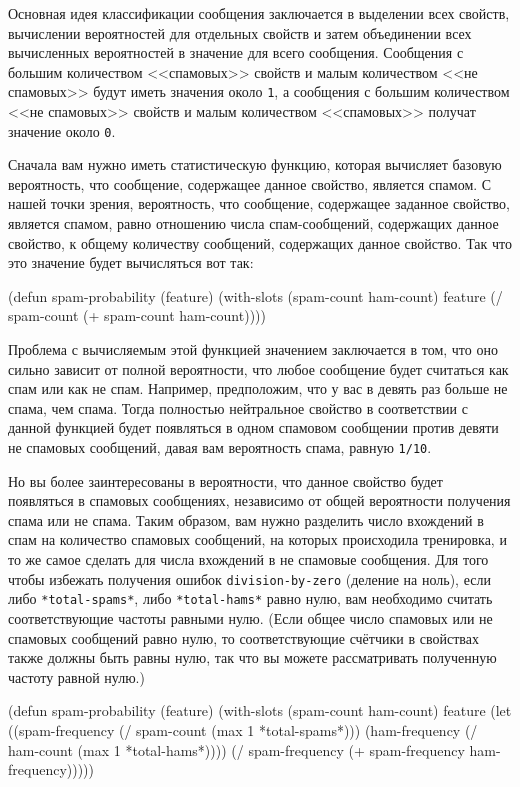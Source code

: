 Основная идея классификации сообщения заключается в выделении всех свойств, вычислении
вероятностей для отдельных свойств и затем объединении всех вычисленных вероятностей в
значение для всего сообщения.  Сообщения с большим количеством <<спамовых>> свойств и малым
количеством <<не спамовых>> будут иметь значения около \lstinline{1}, а сообщения с большим
количеством <<не спамовых>> свойств и малым количеством <<спамовых>> получат значение около
\lstinline{0}.

Сначала вам нужно иметь статистическую функцию, которая вычисляет базовую вероятность, что
сообщение, содержащее данное свойство, является спамом.  С нашей точки зрения,
вероятность, что сообщение, содержащее заданное свойство, является спамом, равно отношению
числа спам-сообщений, содержащих данное свойство, к общему количеству сообщений,
содержащих данное свойство.  Так что это значение будет вычисляться вот так:

\begin{myverb}
(defun spam-probability (feature)
  (with-slots (spam-count ham-count) feature
    (/ spam-count (+ spam-count ham-count))))
\end{myverb}

Проблема с вычисляемым этой функцией значением заключается в том, что оно сильно зависит
от полной вероятности, что любое сообщение будет считаться как спам или как не спам.
Например, предположим, что у вас в девять раз больше не спама, чем спама.  Тогда полностью
нейтральное свойство в соответствии с данной функцией будет появляться в одном спамовом
сообщении против девяти не спамовых сообщений, давая вам вероятность спама, равную
\lstinline{1/10}.

Но вы более заинтересованы в вероятности, что данное свойство будет появляться в спамовых
сообщениях, независимо от общей вероятности получения спама или не спама.  Таким образом,
вам нужно разделить число вхождений в спам на количество спамовых сообщений, на которых
происходила тренировка, и то же самое сделать для числа вхождений в не спамовые сообщения.
Для того чтобы избежать получения ошибок \lstinline{division-by-zero} (деление на ноль), если
либо \lstinline{*total-spams*}, либо \lstinline{*total-hams*} равно нулю, вам необходимо считать
соответствующие частоты равными нулю. (Если общее число спамовых или не спамовых сообщений
равно нулю, то соответствующие счётчики в свойствах также должны быть равны нулю, так что
вы можете рассматривать полученную частоту равной нулю.)

\begin{myverb}
(defun spam-probability (feature)
  (with-slots (spam-count ham-count) feature
    (let ((spam-frequency (/ spam-count (max 1 *total-spams*)))
          (ham-frequency (/ ham-count (max 1 *total-hams*))))
      (/ spam-frequency (+ spam-frequency ham-frequency)))))
\end{myverb}

